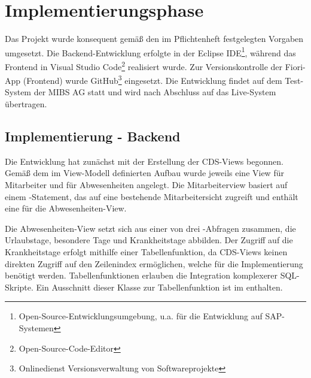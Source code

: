 \section{Implementierungsphase}
\label{sec:Implementierungsphase}

Das Projekt wurde konsequent gemäß den im Pflichtenheft festgelegten Vorgaben umgesetzt. Die Backend-Entwicklung erfolgte in der Eclipse IDE\footnote{Open-Source-Entwicklungsumgebung, u.a. für die Entwicklung auf SAP-Systemen}, während das Frontend in Visual Studio Code\footnote{Open-Source-Code-Editor} realisiert wurde. Zur Versionskontrolle der Fiori-App (Frontend) wurde GitHub\footnote{ Onlinedienst Versionsverwaltung von Softwareprojekte} eingesetzt. Die Entwicklung findet auf dem Test-System der MIBS AG statt und wird nach Abschluss auf das Live-System übertragen.

\subsection{Implementierung - Backend}
\label{sec:Implementierung - Backend}



Die Entwicklung hat zunächst mit der Erstellung der CDS-Views begonnen. Gemäß dem im View-Modell definierten Aufbau wurde jeweils eine View für Mitarbeiter und für Abwesenheiten angelegt. Die Mitarbeiterview basiert auf einem -Statement, das auf eine bestehende Mitarbeitersicht zugreift und enthält eine  für die Abwesenheiten-View.

Die Abwesenheiten-View setzt sich  aus einer  von drei -Abfragen zusammen, die Urlaubstage, besondere Tage und Krankheitstage abbilden. Der Zugriff auf die Krankheitstage erfolgt mithilfe einer Tabellenfunktion, da CDS-Views keinen direkten Zugriff auf den Zeilenindex ermöglichen, welche für die Implementierung benötigt werden. Tabellenfunktionen erlauben die Integration komplexerer SQL-Skripte. Ein Ausschnitt dieser Klasse zur Tabellenfunktion ist im  enthalten.

